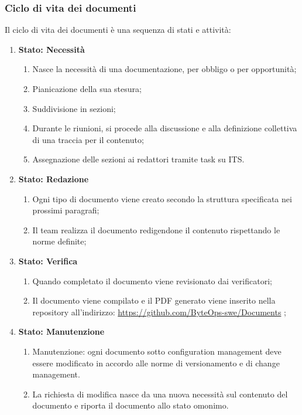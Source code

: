 \subsubsection{Ciclo di vita dei documenti}
Il ciclo di vita dei documenti è una sequenza di stati e attività:
\begin{enumerate}
    \item \textbf{Stato: Necessità}
          \begin{enumerate}
              \item Nasce la necessità di una documentazione, per obbligo o per opportunità;
              \item Pianicazione della sua stesura;
              \item Suddivisione in sezioni;
              \item Durante le riunioni, si procede alla discussione e alla definizione collettiva di una traccia per il contenuto;
              \item Assegnazione delle sezioni ai redattori tramite task su ITS.
          \end{enumerate}
    \item \textbf{Stato: Redazione}
          \begin{enumerate}
              \item  Ogni tipo di documento viene creato secondo la struttura specificata nei prossimi paragrafi;
              \item Il team realizza il documento redigendone il contenuto rispettando le norme definite;
          \end{enumerate}
    \item \textbf{Stato: Verifica}
          \begin{enumerate}
              \item Quando completato il documento viene revisionato dai verificatori;
              \item Il documento viene compilato e il PDF generato viene inserito nella repository all'indirizzo: \href{https://github.com/ByteOps-swe/Documents} {https://github.com/ByteOps-swe/Documents} ;
          \end{enumerate}
    \item \textbf{Stato: Manutenzione}
          \begin{enumerate}
              \item Manutenzione: ogni documento sotto configuration management deve essere modificato in accordo alle norme di versionamento e di change management.
              \item La richiesta di modifica nasce da una nuova necessità sul contenuto del documento e riporta il documento allo stato omonimo.
          \end{enumerate}
\end{enumerate}

